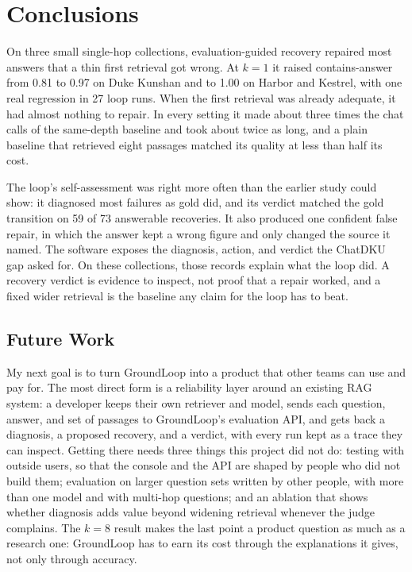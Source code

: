 \documentclass[12pt, a4paper, oneside]{report}
\begin{document}

\chapter{Conclusions}
\label{conclusions}

On three small single-hop collections, evaluation-guided recovery repaired
most answers that a thin first retrieval got wrong. At $k=1$ it raised
contains-answer from 0.81 to 0.97 on Duke Kunshan and to 1.00 on Harbor and
Kestrel, with one real regression in 27 loop runs. When the first retrieval
was already adequate, it had almost nothing to repair. In every setting it
made about three times the chat calls of the same-depth baseline and took
about twice as long, and a plain baseline that retrieved eight passages matched its
quality at less than half its cost.

The loop's self-assessment was right more often than the earlier study
could show: it diagnosed most failures as gold did, and its verdict matched
the gold transition on 59 of 73 answerable recoveries. It also produced one confident false repair, in which the
answer kept a wrong figure and only changed the source it named. The
software exposes the diagnosis, action, and verdict the ChatDKU gap asked
for. On these collections, those records explain what the loop did. A
recovery verdict is evidence to inspect, not proof that a repair worked,
and a fixed wider retrieval is the baseline any claim for the loop has to
beat.

\section{Future Work}

My next goal is to turn GroundLoop into a product that other teams can use
and pay for. The most direct form is a reliability layer around an existing
RAG system: a developer keeps their own retriever and model, sends each
question, answer, and set of passages to GroundLoop's evaluation API, and
gets back a diagnosis, a proposed recovery, and a verdict, with every run
kept as a trace they can inspect. Getting there needs three things this
project did not do: testing with outside users, so that the console and the
API are shaped by people who did not build them; evaluation on larger
question sets written by other people, with more than one model and with
multi-hop questions; and an ablation that shows whether diagnosis adds value
beyond widening retrieval whenever the judge complains. The $k=8$ result
makes the last point a product question as much as a research one:
GroundLoop has to earn its cost through the explanations it gives, not only
through accuracy.
\end{document}
